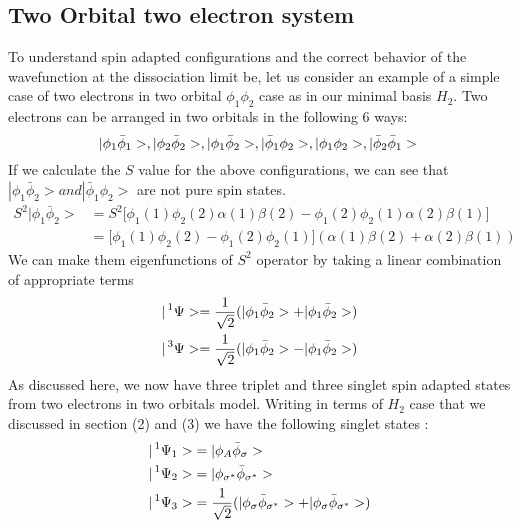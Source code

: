 \documentclass[11pt]{article}   	%
\begin{document}
	\subsection{Two Orbital two electron system}
	To understand spin adapted configurations and the correct behavior of the wavefunction at 
	the dissociation limit be, let us consider an example of a simple case of two electrons in two 
	orbital $\phi_1 \phi_2$ case as in our minimal basis $H_2$. Two electrons can be arranged 
	in two orbitals in the following 6 ways: \\
	\begin{equation}
		|\phi_1\bar{\phi}_1>, |\phi_2\bar{\phi}_2>, |\phi_1\bar{\phi}_2>, |\bar{\phi}_1\phi_2>, |\phi_1\phi_2>, |\bar{\phi}_2\bar{\phi}_1>\\ 
	\end{equation}
	If we calculate the $S$ value for the above configurations, we can see that $|\phi_1\bar{\phi}_2>
	and  |\bar{\phi}_1\phi_2>$ are not pure spin states. \\
	\begin{equation}
	\begin{split}
	S^2|\phi_1\bar{\phi}_2>&=S^2\big[\phi_1(1)\phi_2(2)\alpha(1) \beta(2)-\phi_1(2)\phi_2(1)\alpha(2) \beta(1)\big]\\
		&=\big[\phi_1(1)\phi_2(2)-\phi_1(2)\phi_2(1)\big](\alpha(1) \beta(2)+\alpha(2)\beta(1))
	\end{split}
	\end{equation}
	We can make them eigenfunctions of $S^2$ operator by taking a linear combination of appropriate terms
	\\
	\begin{equation}
	\begin{split}
		|\prescript{1}{}{\Psi}>=\frac{1}{\sqrt{2}}(|\phi_1\bar{\phi}_2>+|\phi_1\bar{\phi}_2>)\\	
		|\prescript{3}{}{\Psi}>=\frac{1}{\sqrt{2}}(|\phi_1\bar{\phi}_2>-|\phi_1\bar{\phi}_2>)\\
	\end{split}
	\end{equation}
	As discussed here, we now have three triplet and three singlet spin adapted states 
	from two electrons in two orbitals model. Writing in terms of $H_2$ case that we discussed in 
	section (2) and (3) we have the following singlet states :\\
	\begin{equation}
	\begin{split}
		|\prescript{1}{}{\Psi_1}>&=|\phi_A\bar{\phi}_{\sigma}>\\
		|\prescript{1}{}{\Psi_2}>&=|\phi_{\sigma^*}\bar{\phi}_{\sigma^*}>\\
		|\prescript{1}{}{\Psi_3}>&=\frac{1}{\sqrt{2}}(|\phi_{\sigma}\bar{\phi}_{\sigma^*}>+
		|\phi_{\sigma}\bar{\phi}_{\sigma^*}>)\\	
	\end{split}
	\end{equation}
\end{document}
